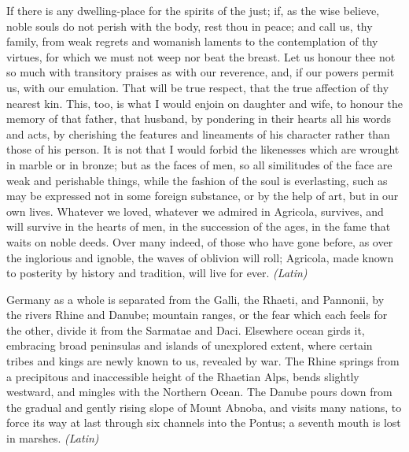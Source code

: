 If there is any dwelling-place for the spirits of the just; if, as the wise believe, noble souls do not perish with the body, rest thou in peace; and call us, thy family, from weak regrets and womanish laments to the contemplation of thy virtues, for which we must not weep nor beat the breast. Let us honour thee not so much with transitory praises as with our reverence, and, if our powers permit us, with our emulation. That will be true respect, that the true affection of thy nearest kin. This, too, is what I would enjoin on daughter and wife, to honour the memory of that father, that husband, by pondering in their hearts all his words and acts, by cherishing the features and lineaments of his character rather than those of his person. It is not that I would forbid the likenesses which are wrought in marble or in bronze; but as the faces of men, so all similitudes of the face are weak and perishable things, while the fashion of the soul is everlasting, such as may be expressed not in some foreign substance, or by the help of art, but in our own lives. Whatever we loved, whatever we admired in Agricola, survives, and will survive in the hearts of men, in the succession of the ages, in the fame that waits on noble deeds. Over many indeed, of those who have gone before, as over the inglorious and ignoble, the waves of oblivion will roll; Agricola, made known to posterity by history and tradition, will live for ever. \emph{(Latin)}




Germany as a whole is separated from the Galli, the Rhaeti, and Pannonii, by the rivers Rhine and Danube; mountain ranges, or the fear which each feels for the other, divide it from the Sarmatae and Daci. Elsewhere ocean girds it, embracing broad peninsulas and islands of unexplored extent, where certain tribes and kings are newly known to us, revealed by war. The Rhine springs from a precipitous and inaccessible height of the Rhaetian Alps, bends slightly westward, and mingles with the Northern Ocean. The Danube pours down from the gradual and gently rising slope of Mount Abnoba, and visits many nations, to force its way at last through six channels into the Pontus; a seventh mouth is lost in marshes. \emph{(Latin)}


